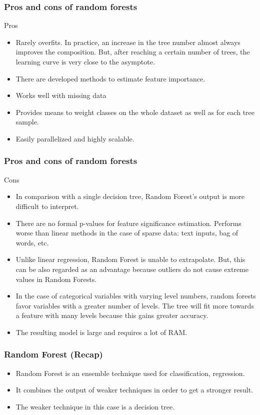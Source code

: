 \begin{frame}[fragile]\frametitle{Pros and cons of random forests}
Pros
\begin{itemize}
\item Rarely overfits. In practice, an increase in the tree number almost always improves the composition. But, after reaching a certain number of trees, the learning curve is very close to the asymptote.
\item There are developed methods to estimate feature importance.
\item Works well with missing data
\item Provides means to weight classes on the whole dataset as well as for each tree sample.
\item Easily parallelized and highly scalable.
\end{itemize}
\end{frame}


\begin{frame}[fragile]\frametitle{Pros and cons of random forests}
Cons
\begin{itemize}
\item In comparison with a single decision tree, Random Forest's output is more difficult to interpret.
\item There are no formal p-values for feature significance estimation.
Performs worse than linear methods in the case of sparse data: text inputs, bag of words, etc.
\item Unlike linear regression, Random Forest is unable to extrapolate. But, this can be also regarded as an advantage because outliers do not cause extreme values in Random Forests.
\item In the case of categorical variables with varying level numbers, random forests favor variables with a greater number of levels. The tree will fit more towards a feature with many levels because this gains greater accuracy.
\item The resulting model is large and requires a lot of RAM.
\end{itemize}
\end{frame}



\begin{frame}[fragile]\frametitle{Random Forest (Recap)}
\begin{itemize}
\item Random Forest is an ensemble technique used for classification, regression.
\item It combines the output of weaker techniques in order to get a stronger result.
\item The weaker technique in this case is a decision tree. 
\end{itemize}
\end{frame}

